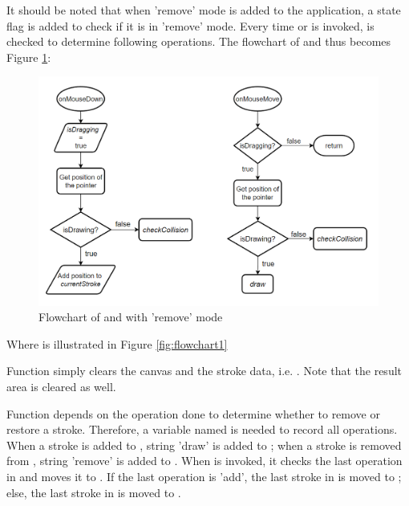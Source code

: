 \documentclass[12pt,twoside]{report}
\begin{document}
It should be noted that when 'remove' mode is added to the application, a state flag  is added to check if it is in 'remove' mode. Every time  or  is invoked,  is checked to determine following operations. The flowchart of  and  thus becomes Figure \ref{fig:flowchart3}: 
\begin{figure}[H]
    \centering
    \includegraphics[width=\linewidth, frame]{figures/flowchart3.png}
    \caption{Flowchart of  and  with 'remove' mode}
    \label{fig:flowchart3}
\end{figure}
Where  is illustrated in Figure \ref{fig:flowchart1}

Function  simply clears the canvas and the stroke data, i.e. . Note that the result area is cleared as well.

Function  depends on the operation done to determine whether to
remove or restore a stroke. Therefore, a variable named  is
needed to record all operations. When a stroke is added to ,
string 'draw' is added to ; when a stroke is removed from
, string 'remove' is added to . When
 is invoked, it checks the last operation in  and
moves it to . If the last operation is 'add', the last
stroke in  is moved to ; else, the last
stroke in  is moved to .
\end{document}
